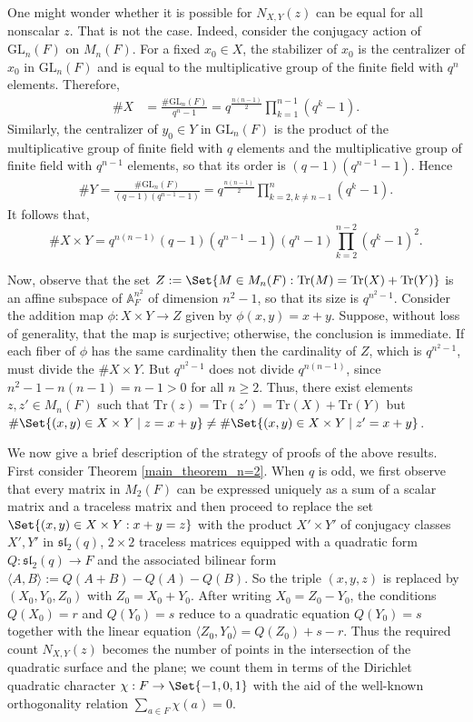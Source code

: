 \documentclass[preprint,11pt]{amsart}
\def\A{\mathbb{A}}
\theoremstyle{definition}
\numberwithin{thm}{section}
\def\sl{\mathfrak{sl}}
\newcommand{\ip}[1]{\langle #1 \rangle}
\newcommand{\tr}{\textrm{Tr}}
\newcommand{\GL}{\textrm{GL}}
\begin{document}
One might wonder whether it is possible for $N_{X,Y}(z)$ can be equal for all nonscalar $z$. That is not the case. Indeed, consider the conjugacy action of $\GL_n(F)$ on $M_n(F)$. For a fixed $x_{0}\in X$, the stabilizer of $x_{0}$ is the centralizer of $x_{0}$ in $\GL_n(F)$ and is equal to the multiplicative group of the finite field with $q^n$ elements. Therefore, 
\begin{align*}
\#{X} &= \frac{\#{\GL_n(F)}}{q^{n}-1} = q^{\frac{n(n-1)}{2}} \prod_{k=1}^{n-1}(q^{k}-1).
\end{align*}
Similarly, the centralizer of $y_{0}\in Y$ in $\GL_n(F)$ is the product of the multiplicative group of finite field with $q$ elements and the multiplicative group of finite field with $q^{n-1}$ elements, so that its order is $(q-1)(q^{n-1}-1)$. Hence 
\begin{align*}
\#Y = \frac{\#{\GL_n(F)}}{(q-1)(q^{n-1}-1)} = q^{\frac{n(n-1)}{2}}\prod_{k=2, k\ne n-1}^{n}(q^{k}-1).
\end{align*}
It follows that, $$\#{X\times Y}=q^{n(n-1)}(q-1)(q^{n-1}-1)(q^{n}-1)\prod_{k=2}^{n-2}(q^{k}-1)^{2}.$$

\noindent Now, observe  that the set $Z := \Set{ M \in M_n(F) : \tr(M)=\tr(X)+ \tr(Y) }$ is an affine subspace of $\A^{n^2}_{F}$ of dimension $n^{2}-1$, so that its size is $q^{n^{2}-1}$. Consider the addition map $\phi:X\times Y \longrightarrow Z$ given by $\phi(x,y)=x+y$. Suppose, without loss of generality, that the map is surjective; otherwise, the conclusion is immediate. If each fiber of $\phi$ has the same cardinality then the cardinality of $Z$, which is $q^{n^{2}-1}$, must divide the $\# X\times Y$. But $q^{n^{2}-1}$ does not divide $q^{n(n-1)}$, since $n^{2}-1-n(n-1)=n-1>0$ for all $n \geq 2$.   Thus, there exist elements $z,z' \in M_n(F)$ such that $\tr(z)=\tr(z')=\tr(X)+\tr(Y)$ but $\# \Set{(x,y)\in X\times Y\mid z=x+y } \neq \# \Set{(x,y)\in X\times Y\mid z'=x+y}$.







We now give a brief description of the strategy of proofs of the above results. First consider Theorem \ref{main_theorem_n=2}. 
When $q$ is odd, we first observe that every matrix in $M_2(F)$ can be expressed uniquely as a sum of a scalar matrix and a traceless matrix and then proceed to replace the set $\Set{ (x,y) \in X \times Y : x + y = z}$ with the product $X' \times Y'$ of conjugacy classes $X', Y'$ in $\sl_2(q)$, $2 \times 2$ traceless matrices equipped with a quadratic form $Q: \sl_2(q) \to F$ and the associated bilinear form $\ip{A,B} := Q(A+B) - Q(A) - Q(B)$. So the triple $(x,y,z)$ is replaced by $(X_0, Y_0, Z_0)$ with $Z_0 = X_0 + Y_0$. After writing $X_0 = Z_0 - Y_0$, the conditions $Q(X_0) = r$ and $Q(Y_0) = s$ reduce to a quadratic equation $Q(Y_0) = s$ together with the linear equation $\ip{Z_0, Y_0} = Q(Z_0) + s - r$. Thus the required count $N_{X,Y}(z)$ becomes the number of points in the intersection of the quadratic surface and the plane; we count them in terms of the Dirichlet quadratic character $\chi:F \to \Set{-1,0,1}$  with the aid of the well-known orthogonality relation $\sum_{a \in F} \chi(a) = 0$.
\end{document}
